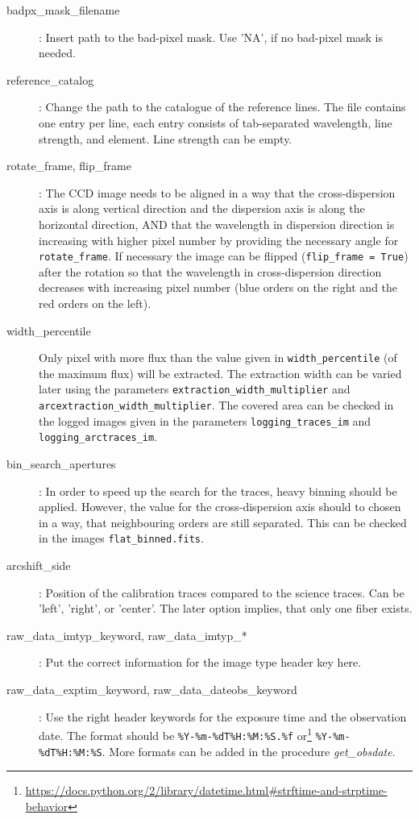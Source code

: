\documentclass[10pt,a4paper]{article}
\begin{document}
\begin{description}
  \item[badpx\_mask\_filename] : Insert path to the bad-pixel mask. Use 'NA', if no bad-pixel mask is needed.
  \item[reference\_catalog] : Change the path to the catalogue of the reference lines. The file contains one entry per line, each entry consists of tab-separated wavelength, line strength, and element. Line strength can be empty.
  \item[rotate\_frame, flip\_frame] : The CCD image needs to be aligned in a way that the cross-dispersion axis is along vertical direction and the dispersion axis is along the horizontal direction, AND that the wavelength in dispersion direction is increasing with higher pixel number by providing the necessary angle for \verb|rotate_frame|. If necessary the image can be flipped (\verb|flip_frame = True|) after the rotation so that the wavelength in cross-dispersion direction decreases with increasing pixel number (blue orders on the right and the red orders on the left).
  \item[width\_percentile] Only pixel with more flux than the value given in \verb|width_percentile| (of the maximum flux) will be extracted. The extraction width can be varied later using the parameters \verb|extraction_width_multiplier| and \verb|arcextraction_width_multiplier|. The covered area can be checked in the logged images given in the parameters \verb|logging_traces_im| and \verb|logging_arctraces_im|. %
  \item[bin\_search\_apertures] : In order to speed up the search for the traces, heavy binning should be applied. However, the value for the cross-dispersion axis should to chosen in a way, that neighbouring orders are still separated. This can be checked in the images \verb|flat_binned.fits|.
  \item[arcshift\_side] : Position of the calibration traces compared to the science traces. Can be 'left', 'right', or 'center'. The later option implies, that only one fiber exists.
  \item[raw\_data\_imtyp\_keyword, raw\_data\_imtyp\_*] : Put the correct information for the image type header key here. 
  \item[raw\_data\_exptim\_keyword, raw\_data\_dateobs\_keyword] : Use the right header keywords for the exposure time and the observation date. The format should be \verb|%Y-%m-%dT%H:%M:%S.%f| or\footnote{\url{https://docs.python.org/2/library/datetime.html\#strftime-and-strptime-behavior}} \verb|%Y-%m-%dT%H:%M:%S|. More formats can be added in the procedure \textit{get\_obsdate}.

\end{description}
\end{document}
